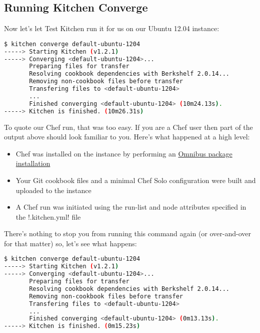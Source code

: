 \subsection{Running Kitchen Converge}

Now let's let Test Kitchen run it for us on our Ubuntu 12.04 instance:

\begin{lstlisting}[language=Bash,label=lst:testing-test-kitchen9]
$ kitchen converge default-ubuntu-1204
-----> Starting Kitchen (v1.2.1)
-----> Converging <default-ubuntu-1204>...
       Preparing files for transfer
       Resolving cookbook dependencies with Berkshelf 2.0.14...
       Removing non-cookbook files before transfer
       Transfering files to <default-ubuntu-1204>
       ...
       Finished converging <default-ubuntu-1204> (10m24.13s).
-----> Kitchen is finished. (10m26.31s)
\end{lstlisting}

To quote our Chef run, that was too easy. If you are a Chef user then part of the output above should look familiar to you. Here's what happened at a high level:

\begin{itemize}
  \item Chef was installed on the instance by performing an \href{http://www.opscode.com/chef/install/}{Omnibus package installation}
  \item Your Git cookbook files and a minimal Chef Solo configuration were built and uploaded to the instance
  \item A Chef run was initiated using the run-list and node attributes specified in the \inline!.kitchen.yml! file
\end{itemize}

There's nothing to stop you from running this command again (or over-and-over for that matter) so, let's see what happens:

\begin{lstlisting}[language=Bash,label=lst:testing-test-kitchen10]
$ kitchen converge default-ubuntu-1204
-----> Starting Kitchen (v1.2.1)
-----> Converging <default-ubuntu-1204>...
       Preparing files for transfer
       Resolving cookbook dependencies with Berkshelf 2.0.14...
       Removing non-cookbook files before transfer
       Transfering files to <default-ubuntu-1204>
       ...
       Finished converging <default-ubuntu-1204> (0m13.13s).
-----> Kitchen is finished. (0m15.23s)
\end{lstlisting}

